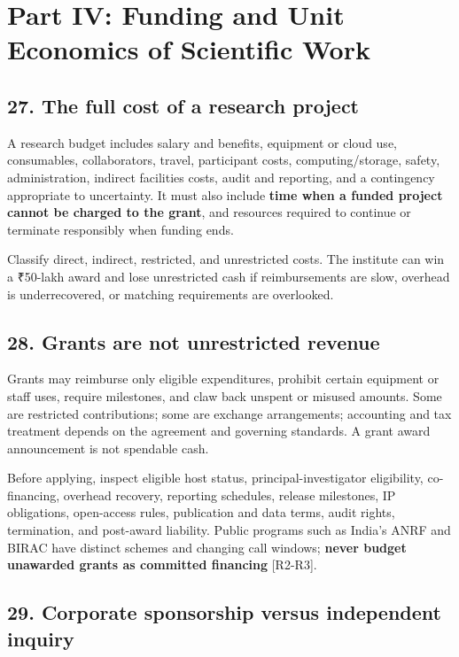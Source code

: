 \section{Part IV: Funding and Unit Economics of Scientific Work}

\subsection{27. The full cost of a research project}

A research budget includes salary and benefits, equipment or cloud use, consumables, collaborators, travel, participant costs, computing/storage, safety, administration, indirect facilities costs, audit and reporting, and a contingency appropriate to uncertainty. It must also include \textbf{time when a funded project cannot be charged to the grant}, and resources required to continue or terminate responsibly when funding ends.

Classify direct, indirect, restricted, and unrestricted costs. The institute can win a ₹50-lakh award and lose unrestricted cash if reimbursements are slow, overhead is underrecovered, or matching requirements are overlooked.

\subsection{28. Grants are not unrestricted revenue}

Grants may reimburse only eligible expenditures, prohibit certain equipment or staff uses, require milestones, and claw back unspent or misused amounts. Some are restricted contributions; some are exchange arrangements; accounting and tax treatment depends on the agreement and governing standards. A grant award announcement is not spendable cash.

Before applying, inspect eligible host status, principal-investigator eligibility, co-financing, overhead recovery, reporting schedules, release milestones, IP obligations, open-access rules, publication and data terms, audit rights, termination, and post-award liability. Public programs such as India's ANRF and BIRAC have distinct schemes and changing call windows; \textbf{never budget unawarded grants as committed financing} [R2-R3].

\subsection{29. Corporate sponsorship versus independent inquiry}


